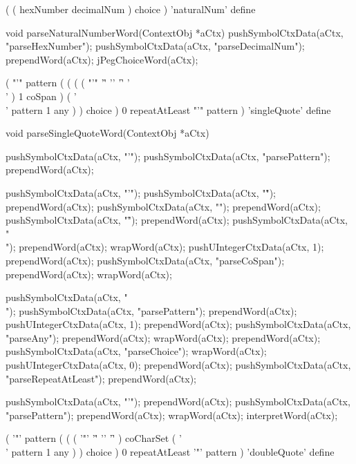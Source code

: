 \starttyping
(
  ( hexNumber decimalNum ) choice
) 'naturalNum' define
\stoptyping

\startCCode
void parseNaturalNumberWord(ContextObj *aCtx) {
  pushSymbolCtxData(aCtx, "parseHexNumber");
  pushSymbolCtxData(aCtx, "parseDecimalNum");
  prependWord(aCtx);
  jPegChoiceWord(aCtx);
}
\stopCCode

\starttyping
(
  "'" pattern
  ( 
    (
      ( ( "'" '\r' '\n' '\f' '\\' ) 1 coSpan )
      ( '\\' pattern 1 any )
    ) choice
  ) 0 repeatAtLeast
  "'" pattern
) 'singleQuote' define
\stoptyping

\startCCode
void parseSingleQuoteWord(ContextObj *aCtx) {
  pushSymbolCtxData(aCtx, "'");
  pushSymbolCtxData(aCtx, "parsePattern");
  prependWord(aCtx);
  
  pushSymbolCtxData(aCtx, "'");
  pushSymbolCtxData(aCtx, "\r");
  prependWord(aCtx);
  pushSymbolCtxData(aCtx, "\n");
  prependWord(aCtx);
  pushSymbolCtxData(aCtx, "\f");
  prependWord(aCtx);
  pushSymbolCtxData(aCtx, "\\");
  prependWord(aCtx);
  wrapWord(aCtx);
  pushUIntegerCtxData(aCtx, 1);
  prependWord(aCtx);
  pushSymbolCtxData(aCtx, "parseCoSpan");
  prependWord(aCtx);
  wrapWord(aCtx);
  
  pushSymbolCtxData(aCtx, "\\");
  pushSymbolCtxData(aCtx, "parsePattern");
  prependWord(aCtx);
  pushUIntegerCtxData(aCtx, 1);
  prependWord(aCtx);
  pushSymbolCtxData(aCtx, "parseAny");
  prependWord(aCtx);
  wrapWord(aCtx);
  prependWord(aCtx);
  pushSymbolCtxData(aCtx, "parseChoice");
  wrapWord(aCtx);
  pushUIntegerCtxData(aCtx, 0);
  prependWord(aCtx);
  pushSymbolCtxData(aCtx, "parseRepeatAtLeast");
  prependWord(aCtx);
  
  pushSymbolCtxData(aCtx, "'");
  prependWord(aCtx);
  pushSymbolCtxData(aCtx, "parsePattern");
  prependWord(aCtx);
  wrapWord(aCtx);
  interpretWord(aCtx);
}
\stopCCode

\starttyping
(
  '"' pattern
  ( 
    (
      ( '"' '\r' '\n' '\f' ) coCharSet
      ( '\\' pattern 1 any )
    ) choice
  ) 0 repeatAtLeast
  '"' pattern
) 'doubleQuote' define
\stoptyping

